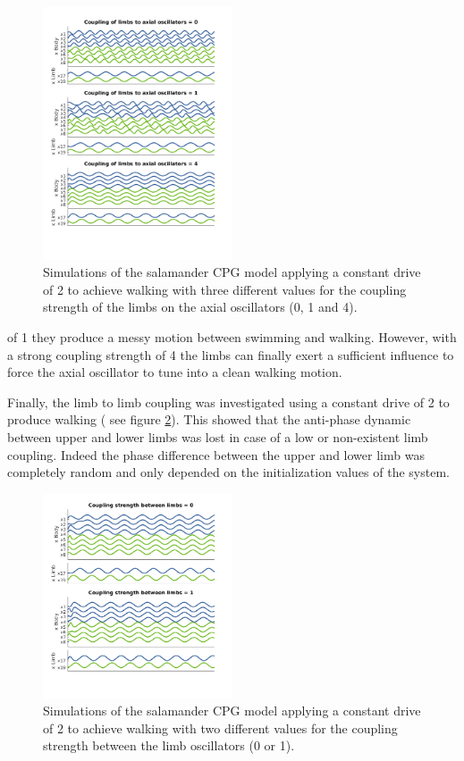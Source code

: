 \documentclass[a4paper]{scrartcl}
\begin{document}
\begin{figure}[!h]
	\includegraphics[width=0.5\textwidth]{fig/figure7c_limbaxial-coupling.png}
	\vspace*{-1.5cm}
	\caption{Simulations of the salamander CPG model applying a constant drive of 2 to achieve walking with three different values for the coupling strength of the limbs on the axial oscillators (0, 1 and 4).}
	\label{fig:7c-limbaxialcoupling}
\end{figure}

{\setlength{\parindent}{0 cm}
of 1 they produce a messy motion between swimming and walking. However, with a strong coupling strength of 4 the limbs can finally exert a sufficient influence to force the axial oscillator to tune into a clean walking motion.
}

Finally, the limb to limb coupling was investigated using a constant drive of 2 to produce walking ( see figure \ref{fig:7c-limbcoupling}). This showed that the anti-phase dynamic between upper and lower limbs was lost in case of a low or non-existent limb coupling. Indeed the phase difference between the upper and lower limb was completely random and only depended on the initialization values of the system.

\begin{figure}[!h]
	\includegraphics[width=0.5\textwidth]{fig/figure7c_limb-coupling.png}
	\vspace*{-1.5cm}
	\caption{Simulations of the salamander CPG model applying a constant drive of 2 to achieve walking with two different values for the coupling strength between the limb oscillators (0 or 1).}
	\label{fig:7c-limbcoupling}
\end{figure}
\end{document}
